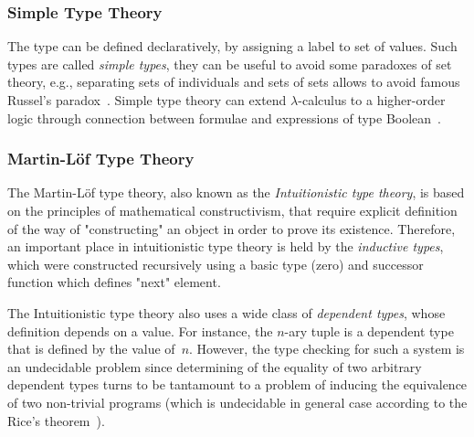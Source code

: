 \documentclass[article]{aaltoseries}
\begin{document}
\subsubsection{Simple Type Theory}
The type can be defined declaratively, by assigning a label to set of values. Such types are called \textit{simple types}, they can be useful to avoid some paradoxes of set theory, e.g., separating sets of individuals and sets of sets allows to avoid famous Russel's paradox~\cite{Irv95}. Simple type theory can extend $\lambda$-calculus to a higher-order logic through connection between formulae and expressions of type Boolean~\cite{Paulson90}.





\subsubsection{Martin-Löf Type Theory}
The Martin-Löf type theory, also known as the \textit{Intuitionistic type theory}, is based on the principles of mathematical constructivism, that require explicit definition of the way of "constructing" an object in order to prove its existence. Therefore, an important place in intuitionistic type theory is held by the \textit{inductive types}, which were constructed recursively using a basic type (zero) and successor function which defines "next" element.

The Intuitionistic type theory also uses a wide class of \textit{dependent types}, whose definition depends on a value. For instance, the $n$-ary tuple is a dependent type that is defined by the value of~$n$. However, the type checking for such a system is an undecidable problem since determining of the equality of two arbitrary dependent types turns to be tantamount to a problem of inducing the equivalence of two non-trivial programs (which is undecidable in general case according to the Rice's theorem~\cite{Rice53}).
\end{document}
